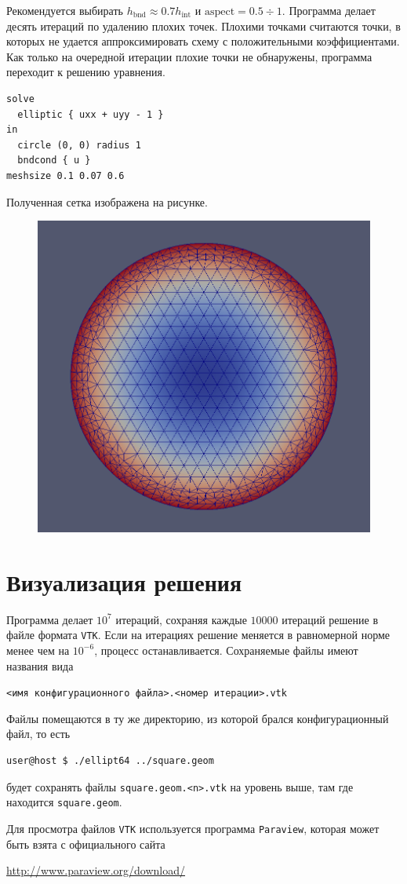 \documentclass[12pt]{article}
\let\dividesymbol\div
\renewcommand{\div}{\operatorname{div}}
\begin{document}
Рекомендуется выбирать $h_\text{bnd} \approx 0.7 h_\text{int}$ и $\text{aspect} = 0.5 \dividesymbol 1$. Программа делает десять итераций по удалению плохих точек. Плохими точками считаются точки, в которых не удается аппроксимировать схему с положительными коэффициентами.
Как только на очередной итерации плохие точки не обнаружены, программа переходит к решению уравнения.

\begin{verbatim}
solve 
  elliptic { uxx + uyy - 1 }
in
  circle (0, 0) radius 1
  bndcond { u }
meshsize 0.1 0.07 0.6
\end{verbatim}
Полученная сетка изображена на рисунке.
\begin{figure}[!ht]
\centering
\includegraphics[width=.5\textwidth]{mesh.png}
\end{figure}

\FloatBarrier
\section{Визуализация решения}

Программа делает $10^7$ итераций, сохраняя каждые $10000$ итераций решение в файле формата \texttt{VTK}. Если на итерациях решение меняется в равномерной норме менее чем на $10^{-6}$, процесс останавливается. Сохраняемые файлы имеют названия вида 

\verb|<имя конфигурационного файла>.<номер итерации>.vtk|

Файлы помещаются в ту же директорию, из которой брался конфигурационный файл, то есть
\begin{verbatim}
user@host $ ./ellipt64 ../square.geom
\end{verbatim}
будет сохранять файлы \verb|square.geom.<n>.vtk| на уровень выше, там где находится \verb|square.geom|.

Для просмотра файлов \verb|VTK| используется программа \texttt{Paraview}, которая может быть взята с официального сайта 

\url{http://www.paraview.org/download/}
\end{document}
